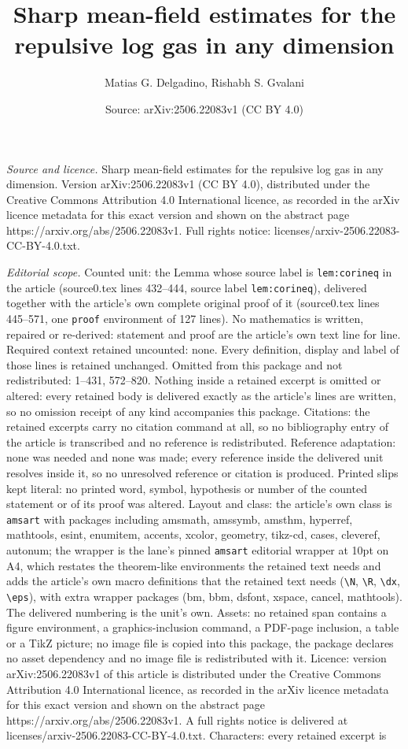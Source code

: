 \documentclass[10pt,a4paper]{amsart}
\title[Sharp mean-field estimates for the repulsive log gas in any ]{Sharp mean-field estimates for the repulsive log gas in any dimension}
\author{Matias G. Delgadino, Rishabh S. Gvalani}
\date{Source: arXiv:2506.22083v1 (CC BY 4.0)}
\begin{document}
\maketitle

\noindent\emph{Source and licence.} Sharp mean-field estimates for the repulsive log gas in any dimension. Version arXiv:2506.22083v1 (CC BY 4.0), distributed under the Creative Commons Attribution 4.0 International licence, as recorded in the arXiv licence metadata for this exact version and shown on the abstract page https://arxiv.org/abs/2506.22083v1. Full rights notice: licenses/arxiv-2506.22083-CC-BY-4.0.txt.\par\smallskip

\noindent\textit{Editorial scope.} Counted unit: the Lemma whose source label is \texttt{lem:corineq} in the article (source0.tex lines 432--444, source label \texttt{lem:corineq}), delivered together with the article's own complete original proof of it (source0.tex lines 445--571, one \texttt{proof} environment of 127 lines). No mathematics is written, repaired or re-derived: statement and proof are the article's own text line for line. Required context retained uncounted: none. Every definition, display and label of those lines is retained unchanged. Omitted from this package and not redistributed: 1--431, 572--820. Nothing inside a retained excerpt is omitted or altered: every retained body is delivered exactly as the article's lines are written, so no omission receipt of any kind accompanies this package. Citations: the retained excerpts carry no citation command at all, so no bibliography entry of the article is transcribed and no reference is redistributed. Reference adaptation: none was needed and none was made; every reference inside the delivered unit resolves inside it, so no unresolved reference or citation is produced. Printed slips kept literal: no printed word, symbol, hypothesis or number of the counted statement or of its proof was altered. Layout and class: the article's own class is \texttt{amsart} with packages including amsmath, amssymb, amsthm, hyperref, mathtools, esint, enumitem, accents, xcolor, geometry, tikz-cd, cases, cleveref, autonum; the wrapper is the lane's pinned \texttt{amsart} editorial wrapper at 10pt on A4, which restates the theorem-like environments the retained text needs and adds the article's own macro definitions that the retained text needs (\texttt{\textbackslash N}, \texttt{\textbackslash R}, \texttt{\textbackslash dx}, \texttt{\textbackslash eps}), with extra wrapper packages (bm, bbm, dsfont, xspace, cancel, mathtools). The delivered numbering is the unit's own. Assets: no retained span contains a figure environment, a graphics-inclusion command, a PDF-page inclusion, a table or a TikZ picture; no image file is copied into this package, the package declares no asset dependency and no image file is redistributed with it. Licence: version arXiv:2506.22083v1 of this article is distributed under the Creative Commons Attribution 4.0 International licence, as recorded in the arXiv licence metadata for this exact version and shown on the abstract page https://arxiv.org/abs/2506.22083v1. A full rights notice is delivered at licenses/arxiv-2506.22083-CC-BY-4.0.txt. Characters: every retained excerpt is 
\end{document}
